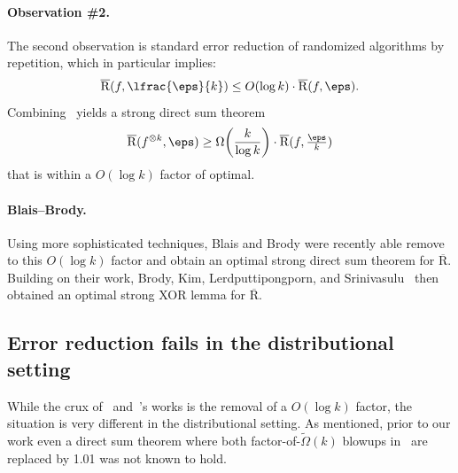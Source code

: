 \documentclass[11pt]{article}
\DeclarePairedDelimiter\paren{(}{)}
\begin{document}
\paragraph{Observation \#2.} The second observation is standard error reduction of randomized algorithms by repetition,  which in particular implies:  
\begin{equation} \overline{\mathrm{R}}(f, \lfrac{\eps}{k}) \leq O\paren*{\log k}\cdot \overline{\mathrm{R}}(f,\eps).\label{eq:success-amplification}
\end{equation} 
Combining~ yields a strong direct sum theorem
\begin{equation*}
    \overline{\mathrm{R}}(f^{\otimes k}, \eps) \geq \Omega\paren*{\frac{k}{\log k}} \cdot \overline{\mathrm{R}}(f,\tfrac{\eps}{k})\label{eq:easy}
\end{equation*}
that is within a $O(\log k)$ factor of optimal.  

\paragraph{Blais--Brody.} Using more sophisticated techniques, Blais and Brody \cite{BB19} were recently able remove to this $O(\log k)$ factor and obtain an optimal strong direct sum theorem for $\overline{\mathrm{R}}$. Building on their work, Brody, Kim, Lerdputtipongporn, and Srinivasulu~\cite{BKLS23} then obtained an optimal strong XOR lemma for $\overline{\mathrm{R}}$. 








\subsection{Error reduction fails in the distributional setting} 

While the crux of~\cite{BB19} and~\cite{BKLS23}'s works is the removal of a $O(\log k)$ factor, the situation is very different in the distributional setting. As mentioned, prior to our work even a direct sum theorem where both factor-of-$\tilde{\Omega}(k)$ blowups in~ are replaced by 1.01 was not known to hold. 
\end{document}
